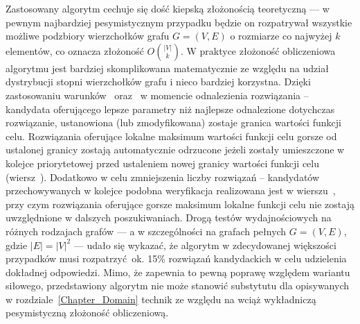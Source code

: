 {  Zastosowany algorytm cechuje się dość kiepską złożonością teoretyczną --- w pewnym najbardziej pesymistycznym przypadku będzie on rozpatrywał wszystkie możliwe podzbiory wierzchołków grafu $G=(V, E)$ o rozmiarze co najwyżej $k$ elementów, co oznacza złożoność $O{|V| \choose k}$.
  W praktyce złożoność obliczeniowa algorytmu jest bardziej skomplikowana matematycznie ze względu na udział dystrybucji stopni wierzchołków grafu i nieco bardziej korzystna.
  Dzięki zastosowaniu warunków~ oraz~ w momencie odnalezienia rozwiązania -- kandydata oferującego lepsze parametry niż najlepsze odnalezione dotychczas rozwiązanie, ustanowiona (lub zmodyfikowana) zostaje granica wartości funkcji celu.
  Rozwiązania oferujące lokalne maksimum wartości funkcji celu gorsze od ustalonej granicy zostają automatycznie odrzucone jeżeli zostały umieszczone w kolejce priorytetowej przed ustaleniem nowej granicy wartości funkcji celu (wiersz~).
  Dodatkowo w celu zmniejszenia liczby rozwiązań -- kandydatów przechowywanych w kolejce podobna weryfikacja realizowana jest w wierszu~, przy czym rozwiązania oferujące gorsze maksimum lokalne funkcji celu nie zostają uwzględnione w dalszych poszukiwaniach.
  Drogą testów wydajnościowych na różnych rodzajach grafów --- a w szczególności na grafach pełnych $G=(V, E)$, gdzie $|E|=|V|^2$ --- udało się wykazać, że algorytm w zdecydowanej większości przypadków musi rozpatrzyć ok. 15\% rozwiązań kandydackich w celu udzielenia dokładnej odpowiedzi.
  Mimo, że zapewnia to pewną poprawę względem wariantu siłowego, przedstawiony algorytm nie może stanowić substytutu dla opisywanych w rozdziale~\ref{Chapter_Domain} technik ze względu na wciąż wykładniczą pesymistyczną złożoność obliczeniową.
}